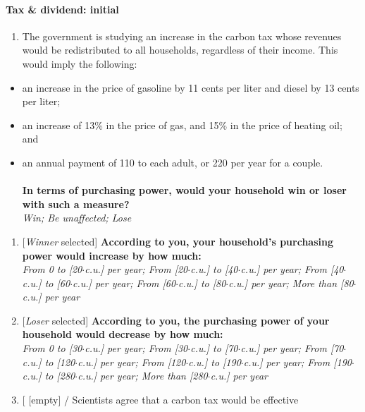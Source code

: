 \documentclass[12pt]{article} %
\begin{document}
\begin{appendices}
\paragraph{Tax \& dividend: initial}
\begin{enumerate}[resume,leftmargin=*]
\item \label{questionnaire:TD}The government is studying an increase in the carbon tax whose revenues
would be redistributed to all households, regardless of their income.
This would imply the following: 
\end{enumerate}
\begin{itemize}
\item an increase in the price of gasoline by 11 cents per liter and diesel
by 13 cents per liter; 
\item an increase of 13\% in the price of gas, and 15\% in the price of
heating oil; and
\item an annual payment of 110\euros{} to each adult, or 220\euros{} per year for a couple.
\\
\\
\textbf{In terms of purchasing power, would your household win or
loser with such a measure? }\emph{}\\
\emph{Win; Be unaffected; Lose}
\end{itemize}
\begin{enumerate}[resume,leftmargin=*]
\item {[}\emph{Winner} selected{]} \textbf{According to you, your household's
purchasing power would increase by how much:} \emph{}\\
\emph{From 0 to {[}20$\cdot$c.u.{]} \euros{} per year; From {[}20$\cdot$c.u.{]}
to {[}40$\cdot$c.u.{]} \euros{} per year; From {[}40$\cdot$c.u.{]} to {[}60$\cdot$c.u.{]}
\euros{} per year; From {[}60$\cdot$c.u.{]} to {[}80$\cdot$c.u.{]} \euros{} per year;
More than {[}80$\cdot$c.u.{]} \euros{} per year}
\item {[}\emph{Loser} selected{]} \textbf{According to you, the purchasing
power of your household would decrease by how much:} \emph{}\\
\emph{From 0 to {[}30$\cdot$c.u.{]} \euros{} per year; From {[}30$\cdot$c.u.{]}
to {[}70$\cdot$c.u.{]} \euros{} per year; From {[}70$\cdot$c.u.{]} to {[}120$\cdot$c.u.{]}
\euros{} per year; From {[}120$\cdot$c.u.{]} to {[}190$\cdot$c.u.{]} \euros{} per
year; From {[}190$\cdot$c.u.{]} to {[}280$\cdot$c.u.{]} \euros{} per year;
More than {[}280$\cdot$c.u.{]} \euros{} per year} 
\item {[} {[}empty{]} / Scientists agree that a carbon tax would be effective

\end{enumerate}
\end{appendices}
\end{document}
